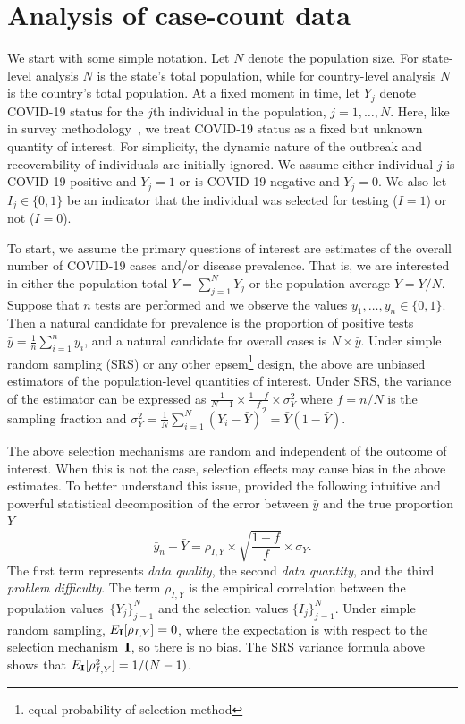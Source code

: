 \documentclass[11pt]{amsart}
\def\I{\bf I}
\begin{document}
\section{Analysis of case-count data}
\label{section:casecount}

We start with some simple notation.  Let $N$ denote the population size.  For state-level analysis $N$ is the state's total population, while for country-level analysis $N$ is the country's total population.  At a fixed moment in time, let $Y_j$ denote COVID-19 status for the $j$th individual in the population, $j=1,\ldots, N$. Here, like in survey methodology~\citep{Cochran77}, we treat COVID-19 status as a fixed but unknown quantity of interest. For simplicity, the dynamic nature of the outbreak and recoverability of individuals are initially ignored.  We assume either individual $j$ is COVID-19 positive and $Y_j=1$ or is COVID-19 negative and $Y_j=0$. We also let $I_j \in \{0,1\}$ be an indicator that the individual was selected for testing ($I = 1$) or not ($I=0$).

To start, we assume the primary questions of interest are estimates of the overall number of COVID-19 cases and/or disease prevalence. That is, we are interested in either the population total $Y = \sum_{j=1}^N Y_j$ or the population average $\bar Y = Y/N$. Suppose that $n$ tests are performed and we observe the values $y_1, \ldots, y_n \in \{0,1\}$.  Then a natural candidate for prevalence is the proportion of positive tests $\bar y = \frac{1}{n} \sum_{i=1}^n y_i$, and a natural candidate for overall cases is $N \times \bar y$.
Under simple random sampling (SRS) or any other epsem\footnote{equal probability of selection method} design, the above are unbiased estimators of the population-level quantities of interest.  Under SRS, the variance of the estimator can be expressed as $\frac{1}{N-1} \times \frac{1-f}{f} \times \sigma_Y^2$ where $f = n/N$ is the sampling fraction and $\sigma_Y^2 = \frac{1}{N} \sum_{i=1}^N (Y_i - \bar Y)^2 = \bar Y (1- \bar Y)$.

The above selection mechanisms are random and independent of the outcome of interest. When this is not the case, selection effects may cause bias in the above estimates. To better understand this issue, \cite{Meng2018} provided the following intuitive and powerful statistical decomposition of the error between $\bar y$ and the true proportion $\bar Y$
$$
\bar y_n - \bar Y =  \rho_{I, Y} \times \sqrt{\frac{1-f}{f}} \times \sigma_Y.
$$
The first term represents \emph{data quality}, the second \emph{data quantity}, and the third \emph{problem difficulty}. The term $\rho_{I,Y}$ is the empirical correlation between the population values~$\{ Y_j \}_{j=1}^N$ and the selection values $\{ I_j \}_{j=1}^N$.  Under simple random sampling, $E_{\I} [ \rho_{I,Y} ] = 0$, where the expectation is with respect to the selection mechanism~$\I$, so there is no bias.  The SRS variance formula above shows that $E_{\I} [ \rho_{I,Y}^2 ]  = 1/(N-1)$.
\end{document}

